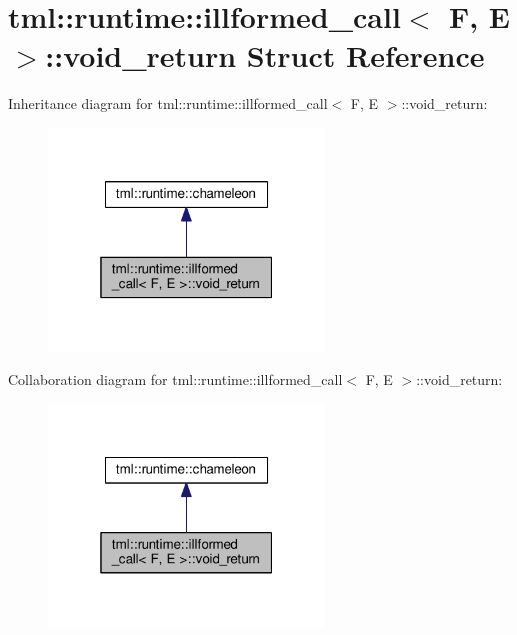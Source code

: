 \hypertarget{structtml_1_1runtime_1_1illformed__call_1_1void__return}{\section{tml\+:\+:runtime\+:\+:illformed\+\_\+call$<$ F, E $>$\+:\+:void\+\_\+return Struct Reference}
\label{structtml_1_1runtime_1_1illformed__call_1_1void__return}
}


Inheritance diagram for tml\+:\+:runtime\+:\+:illformed\+\_\+call$<$ F, E $>$\+:\+:void\+\_\+return\+:
\nopagebreak
\begin{figure}[H]
\begin{center}
\leavevmode
\includegraphics[width=208pt]{structtml_1_1runtime_1_1illformed__call_1_1void__return__inherit__graph}
\end{center}
\end{figure}


Collaboration diagram for tml\+:\+:runtime\+:\+:illformed\+\_\+call$<$ F, E $>$\+:\+:void\+\_\+return\+:
\nopagebreak
\begin{figure}[H]
\begin{center}
\leavevmode
\includegraphics[width=208pt]{structtml_1_1runtime_1_1illformed__call_1_1void__return__coll__graph}
\end{center}
\end{figure}
